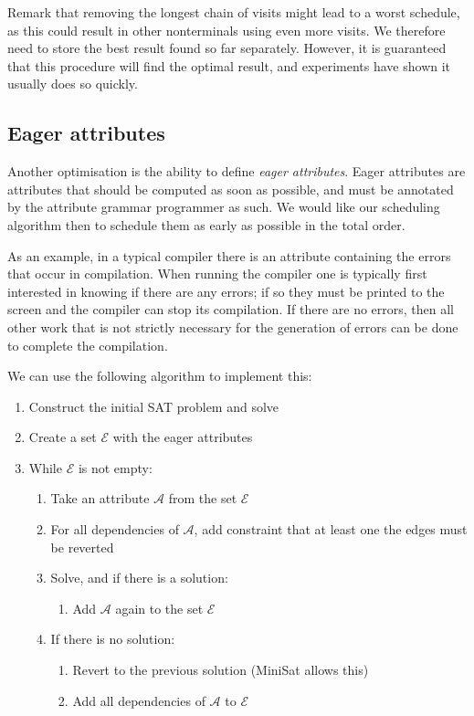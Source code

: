 \documentclass{llncs}
\begin{document}
Remark that removing the longest chain of visits might lead to a worst schedule, as this could result in other nonterminals using even more visits. We therefore need to store the best result found so far separately. However, it is guaranteed that this procedure will find the optimal result, and experiments have shown it usually does so quickly.

\subsection{Eager attributes} \label{sect:eagerattributes}
Another optimisation is the ability to define \emph{eager attributes}. Eager attributes are attributes that should be computed as soon as possible, and must be annotated by the attribute grammar programmer as such. We would like our scheduling algorithm then to schedule them as early as possible in the total order.

As an example, in a typical compiler there is an attribute containing the errors that occur in compilation. When running the compiler one is typically first interested in knowing if there are any errors; if so they must be printed to the screen and the compiler can stop its compilation. If there are no errors, then all other work that is not strictly necessary for the generation of errors can be done to complete the compilation.

We can use the following algorithm to implement this:
\begin{enumerate}
\item Construct the initial SAT problem and solve
\item Create a set $\mathcal{E}$ with the eager attributes
\item While $\mathcal{E}$ is not empty:
\begin{enumerate}
\item Take an attribute $\mathcal{A}$ from the set $\mathcal{E}$
\item For all dependencies of $\mathcal{A}$, add constraint that at least one the edges must be reverted
\item Solve, and if there is a solution:
\begin{enumerate}
\item Add $\mathcal{A}$ again to the set $\mathcal{E}$
\end{enumerate}
\item If there is no solution:
\begin{enumerate}
\item Revert to the previous solution (MiniSat allows this)
\item Add all dependencies of $\mathcal{A}$ to $\mathcal{E}$
\end{enumerate}
\end{enumerate}
\end{enumerate}
\end{document}
